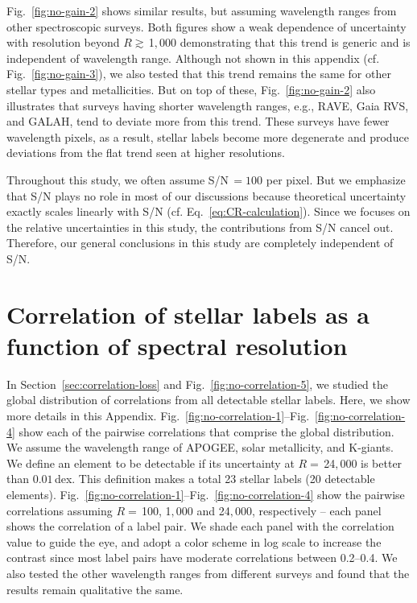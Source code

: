 \documentclass[iop]{emulateapj}
\begin{document}
\begin{CJK*}{UTF8}{gbsn}
Fig.~\ref{fig:no-gain-2} shows similar results, but assuming wavelength ranges from other spectroscopic surveys. Both figures show a weak dependence of uncertainty with resolution beyond $R \gtrsim \,$1$,$000 demonstrating that this trend is generic and is independent of wavelength range. Although not shown in this appendix (cf. Fig.~\ref{fig:no-gain-3}), we also tested that this trend remains the same for other stellar types and metallicities. But on top of these, Fig.~\ref{fig:no-gain-2} also illustrates that surveys having shorter wavelength ranges, e.g., RAVE, Gaia RVS, and GALAH, tend to deviate more from this trend. These surveys have fewer wavelength pixels, as a result, stellar labels become more degenerate and produce deviations from the flat trend seen at higher resolutions.

Throughout this study, we often assume S/N$\,=100$ per pixel. But we emphasize that S/N plays no role in most of our discussions because theoretical uncertainty exactly scales linearly with S/N (cf. Eq.~\ref{eq:CR-calculation}). Since we focuses on the relative uncertainties in this study, the contributions from S/N cancel out. Therefore, our general conclusions in this study are completely independent of S/N. 
 

%
%
%
%
%
%

\section{Correlation of stellar labels as a function of spectral resolution}
\label{sec:correlation-labels}

In Section~\ref{sec:correlation-loss} and Fig.~\ref{fig:no-correlation-5}, we studied the global distribution of correlations from all detectable stellar labels. Here, we show more details in this Appendix. Fig.~\ref{fig:no-correlation-1}--Fig.~\ref{fig:no-correlation-4} show each of the pairwise correlations that comprise the global distribution. We assume the wavelength range of APOGEE, solar metallicity, and K-giants. We define an element to be detectable if its uncertainty at $R = \,$24$,$000 is better than $0.01\,$dex. This definition makes a total 23 stellar labels (20 detectable elements). Fig.~\ref{fig:no-correlation-1}--Fig.~\ref{fig:no-correlation-4} show the pairwise correlations assuming $R = \,$100, 1$,$000 and 24$,$000, respectively -- each panel shows the correlation of a label pair. We shade each panel with the correlation value to guide the eye, and adopt a color scheme in log scale to increase the contrast since most label pairs have moderate correlations between 0.2--0.4. We also tested the other wavelength ranges from different surveys and found that the results remain qualitative the same. 


\end{CJK*}
\end{document}
